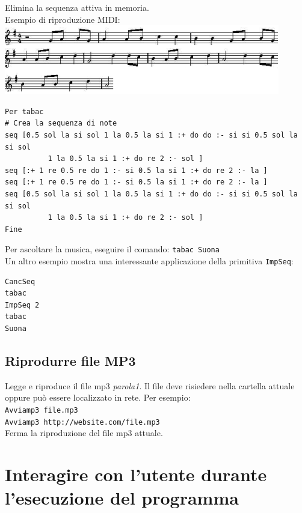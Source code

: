 Elimina la sequenza attiva in memoria. \\ 

Esempio di riproduzione MIDI:\\
\includegraphics{pics/partition.png}
\begin{lstlisting}[caption="Creazione di uno spartito MIDI"]
Per tabac
# Crea la sequenza di note
seq [0.5 sol la si sol 1 la 0.5 la si 1 :+ do do :- si si 0.5 sol la si sol
          1 la 0.5 la si 1 :+ do re 2 :- sol ]
seq [:+ 1 re 0.5 re do 1 :- si 0.5 la si 1 :+ do re 2 :- la ]
seq [:+ 1 re 0.5 re do 1 :- si 0.5 la si 1 :+ do re 2 :- la ]
seq [0.5 sol la si sol 1 la 0.5 la si 1 :+ do do :- si si 0.5 sol la si sol
          1 la 0.5 la si 1 :+ do re 2 :- sol ]
Fine
\end{lstlisting}

Per ascoltare la musica, eseguire il comando: \texttt{tabac Suona}\\
Un altro esempio mostra una interessante applicazione della primitiva \texttt{ImpSeq}:\\
\begin{lstlisting}[caption="Riproduzione di uno spartito MIDI"]
CancSeq
tabac
ImpSeq 2
tabac
Suona
\end{lstlisting}



\subsection{Riprodurre file MP3}

Legge e riproduce il file mp3 \textit{parola1}. Il file deve risiedere nella cartella attuale oppure può essere localizzato in rete. Per esempio:\\
\texttt{Avviamp3 file.mp3}\\
\texttt{Avviamp3 http://website.com/file.mp3}\\

Ferma la riproduzione del file mp3 attuale.






\section{Interagire con l'utente durante l'esecuzione del programma}

